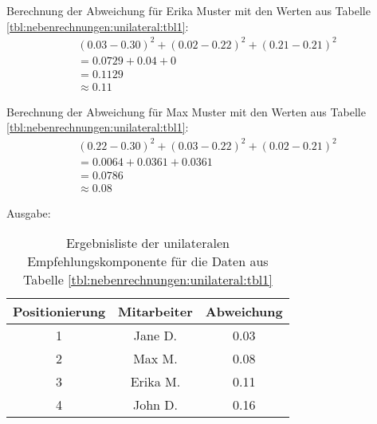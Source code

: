 Berechnung der Abweichung für Erika Muster mit den Werten aus Tabelle \ref{tbl:nebenrechnungen:unilateral:tbl1}:
\begin{gather}
	\nonumber (0.03-0.30)^2 + (0.02-0.22)^2 + (0.21-0.21)^2\\
	\nonumber = 0.0729 + 0.04 + 0\\
	\nonumber = 0.1129\\
	\approx 0.11
	\label{frml:nebenrechnungen:unilateral:erika}
\end{gather}

Berechnung der Abweichung für Max Muster mit den Werten aus Tabelle \ref{tbl:nebenrechnungen:unilateral:tbl1}:
\begin{gather}
	\nonumber (0.22-0.30)^2 + (0.03-0.22)^2 + (0.02-0.21)^2\\
	\nonumber = 0.0064 + 0.0361 + 0.0361\\
	\nonumber = 0.0786\\
	\approx 0.08
	\label{frml:nebenrechnungen:unilateral:max}
\end{gather}

Ausgabe:
\begin{table}[h]
	\centering
	\begin{tabular}{c|c|c}
		Positionierung & Mitarbeiter & Abweichung\\
		\hline
		1 & Jane D.  & 0.03\\
		2 & Max M.   & 0.08\\
		3 & Erika M. & 0.11\\
		4 & John D.  & 0.16
	\end{tabular}
	\caption{Ergebnisliste der unilateralen Empfehlungskomponente für die Daten aus Tabelle \ref{tbl:nebenrechnungen:unilateral:tbl1}}
	\label{tbl:nebenrechnungen:unilateral:ausgabe}
\end{table}
